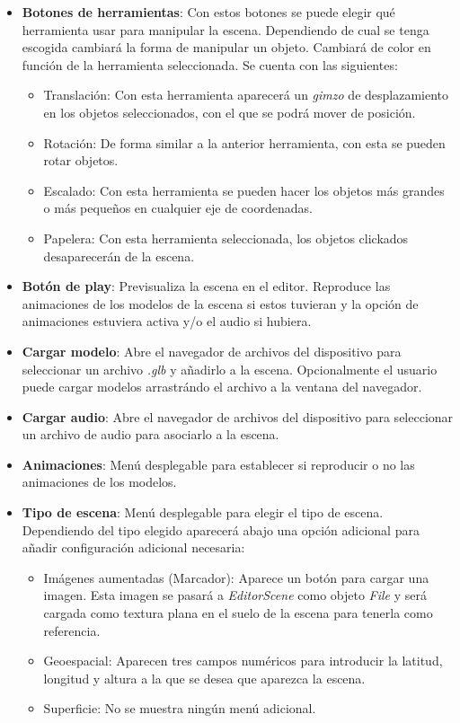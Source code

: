 \begin{itemize}
    \item \textbf{Botones de herramientas}: Con estos botones se puede elegir qué herramienta usar para manipular la escena. Dependiendo de cual se tenga escogida cambiará la forma de manipular un objeto. Cambiará de color en función de la herramienta seleccionada. Se cuenta con las siguientes:
        \begin{itemize}
            \item Translación: Con esta herramienta aparecerá un \textit{gimzo} de desplazamiento en los objetos seleccionados, con el que se podrá mover de posición.
            \item Rotación: De forma similar a la anterior herramienta, con esta se pueden rotar objetos.
            \item Escalado: Con esta herramienta se pueden hacer los objetos más grandes o más pequeños en cualquier eje de coordenadas.
            \item Papelera: Con esta herramienta seleccionada, los objetos clickados desaparecerán de la escena.
        \end{itemize}

    \item \textbf{Botón de play}: Previsualiza la escena en el editor. Reproduce las animaciones de los modelos de la escena si estos tuvieran y la opción de animaciones estuviera activa y/o el audio si hubiera.
    \item \textbf{Cargar modelo}: Abre el navegador de archivos del dispositivo para seleccionar un archivo \textit{.glb} y añadirlo a la escena. Opcionalmente el usuario puede cargar modelos arrastrándo el archivo a la ventana del navegador.
    \item \textbf{Cargar audio}: Abre el navegador de archivos del dispositivo para seleccionar un archivo de audio para asociarlo a la escena.
    \item \textbf{Animaciones}: Menú desplegable para establecer si reproducir o no las animaciones de los modelos.
    \item \textbf{Tipo de escena}: Menú desplegable para elegir el tipo de escena. Dependiendo del tipo elegido aparecerá abajo una opción adicional para añadir configuración adicional necesaria:
        \begin{itemize}
            \item Imágenes aumentadas (Marcador): Aparece un botón para cargar una imagen. Esta imagen se pasará a \textit{EditorScene} como objeto \textit{File} y será cargada como textura plana en el suelo de la escena para tenerla como referencia.
            \item Geoespacial: Aparecen tres campos numéricos para introducir la latitud, longitud y altura a la que se desea que aparezca la escena.
            \item Superficie: No se muestra ningún menú adicional.
        \end{itemize}
\end{itemize}

